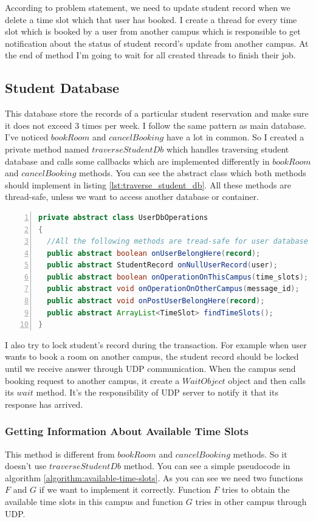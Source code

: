 \documentclass[12pt]{article}
\begin{document}
\par According to problem statement, we need to update student record when we delete a time slot which that user has booked. I create a thread for every time slot which is booked by a user from another campus which is responsible to get notification about the status of student record's update from another campus. At the end of method I'm going to wait for all created threads to finish their job.

\subsection{Student Database}
This database store the records of a particular student reservation and make sure it does not exceed 3 times per week. I follow the same pattern as main database. I've noticed $bookRoom$ and $cancelBooking$ have a lot in common. So I created a private method named $traverseStudentDb$ which handles traversing student database and calls some callbacks which are implemented differently in $bookRoom$ and $cancelBooking$ methods. You can see the abstract class which both methods should implement in listing \ref{lst:traverse_student_db}. All these methods are thread-safe, unless we want to access another database or container.

\begin{lstlisting}[language=java,label={lst:traverse_student_db},caption={UserDbOperations Abstract Class},numbers=left]
private abstract class UserDbOperations
{
  //All the following methods are tread-safe for user database
  public abstract boolean onUserBelongHere(record);
  public abstract StudentRecord onNullUserRecord(user);
  public abstract boolean onOperationOnThisCampus(time_slots);
  public abstract void onOperationOnOtherCampus(message_id); 
  public abstract void onPostUserBelongHere(record);
  public abstract ArrayList<TimeSlot> findTimeSlots();
}
\end{lstlisting}

\par I also try to lock student's record during the transaction. For example when user wants to book a room on another campus, the student record should be locked until we receive answer through UDP communication. When the campus send booking request to another campus, it create a $WaitObject$ object and then calls its $wait$ method. It's the responsibility of UDP server to notify it that its response has arrived.

\subsubsection{Getting Information About Available Time Slots}
This method is different from $bookRoom$ and $cancelBooking$ methods. So it doesn't use $traverseStudentDb$ method. You can see a simple pseudocode in algorithm \ref{algorithm:available-time-slots}. As you can see we need two functions $F$ and $G$ if we want to implement it correctly. Function $F$ tries to obtain the available time slots in this campus and function $G$ tries in other campus through UDP.
\end{document}

